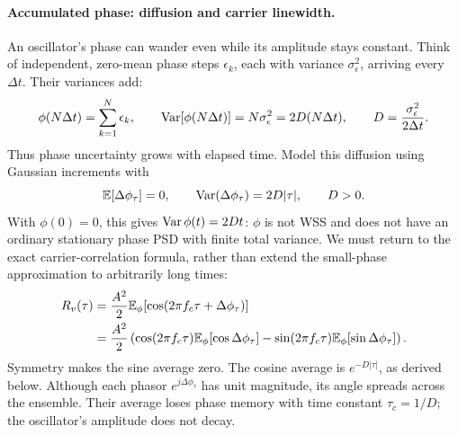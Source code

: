 \paragraph{Accumulated phase: diffusion and carrier linewidth.}
An oscillator's phase can wander even while its amplitude stays constant. Think of independent, zero-mean phase steps $\epsilon_k$, each with variance $\sigma_\epsilon^2$, arriving every $\Delta t$. Their variances add:
\[
\phi(N\Delta t)=\sum_{k=1}^N\epsilon_k,
\qquad
\operatorname{Var}[\phi(N\Delta t)]=N\sigma_\epsilon^2=2D(N\Delta t),
\qquad
D=\frac{\sigma_\epsilon^2}{2\Delta t}.
\]
Thus phase uncertainty grows with elapsed time. Model this diffusion using Gaussian increments with
\[
\mathbb E[\Delta\phi_\tau]=0,\qquad
\operatorname{Var}(\Delta\phi_\tau)=2D|\tau|,\qquad D>0.
\]
With $\phi(0)=0$, this gives $\operatorname{Var}\phi(t)=2Dt$: $\phi$ is not WSS and does not have an ordinary stationary phase PSD with finite total variance. We must return to the exact carrier-correlation formula, rather than extend the small-phase approximation to arbitrarily long times:
\begin{align*}
R_v(\tau)
&=\frac{A^2}{2}\mathbb E_\phi[\cos(2\pi f_c\tau+\Delta\phi_\tau)]\\
&=\frac{A^2}{2}\left(
\cos(2\pi f_c\tau)\mathbb E_\phi[\cos\Delta\phi_\tau]
-\sin(2\pi f_c\tau)\mathbb E_\phi[\sin\Delta\phi_\tau]\right).
\end{align*}
Symmetry makes the sine average zero. The cosine average is $e^{-D|\tau|}$, as derived below. Although each phasor $e^{j\Delta\phi_\tau}$ has unit magnitude, its angle spreads across the ensemble. Their average loses phase memory with time constant $\tau_c=1/D$; the oscillator's amplitude does not decay.


